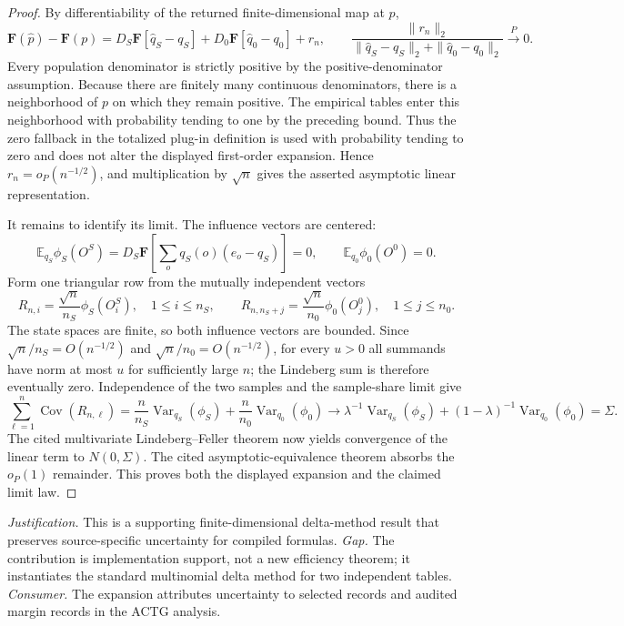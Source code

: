\documentclass{article}
\begin{document}
\begin{proof}
By differentiability of the returned finite-dimensional map at \(p\),
\[
\mathbf F(\widehat p)-\mathbf F(p)
=D_S\mathbf F[\widehat q_S-q_S]
+D_0\mathbf F[\widehat q_0-q_0]+r_n,
\qquad
\frac{\|r_n\|_2}{\|\widehat q_S-q_S\|_2+\|\widehat q_0-q_0\|_2}
\xrightarrow{P}0.
\]
Every population denominator is strictly positive by the positive-denominator assumption.  Because there are finitely many continuous denominators, there is a neighborhood of \(p\) on which they remain positive.  The empirical tables enter this neighborhood with probability tending to one by the preceding bound.  Thus the zero fallback in the totalized plug-in definition is used with probability tending to zero and does not alter the displayed first-order expansion.  Hence \(r_n=o_P(n^{-1/2})\), and multiplication by \(\sqrt n\) gives the asserted asymptotic linear representation.

It remains to identify its limit.  The influence vectors are centered:
\[
\mathbb E_{q_S}\phi_S(O^S)
=D_S\mathbf F\!\left[\sum_o q_S(o)(e_o-q_S)\right]=0,
\qquad
\mathbb E_{q_0}\phi_0(O^0)=0.
\]
Form one triangular row from the mutually independent vectors
\[
R_{n,i}=\frac{\sqrt n}{n_S}\phi_S(O_i^S),
\quad 1\le i\le n_S,
\qquad
R_{n,n_S+j}=\frac{\sqrt n}{n_0}\phi_0(O_j^0),
\quad 1\le j\le n_0.
\]
The state spaces are finite, so both influence vectors are bounded.  Since \(\sqrt n/n_S=O(n^{-1/2})\) and \(\sqrt n/n_0=O(n^{-1/2})\), for every \(u>0\) all summands have norm at most \(u\) for sufficiently large \(n\); the Lindeberg sum is therefore eventually zero.  Independence of the two samples and the sample-share limit give
\[
\sum_{\ell=1}^{n}\operatorname{Cov}(R_{n,\ell})
=\frac n{n_S}\operatorname{Var}_{q_S}(\phi_S)
+\frac n{n_0}\operatorname{Var}_{q_0}(\phi_0)
\longrightarrow
\lambda^{-1}\operatorname{Var}_{q_S}(\phi_S)
+(1-\lambda)^{-1}\operatorname{Var}_{q_0}(\phi_0)
=\Sigma.
\]
The cited multivariate Lindeberg--Feller theorem now yields convergence of the linear term to \(N(0,\Sigma)\).  The cited asymptotic-equivalence theorem absorbs the \(o_P(1)\) remainder.  This proves both the displayed expansion and the claimed limit law.
\end{proof}
\par\smallskip\noindent \textit{Justification.} This is a supporting finite-dimensional delta-method result that preserves source-specific uncertainty for compiled formulas. \textit{Gap.} The contribution is implementation support, not a new efficiency theorem; it instantiates the standard multinomial delta method for two independent tables. \textit{Consumer.} The expansion attributes uncertainty to selected records and audited margin records in the ACTG analysis.
\end{document}
